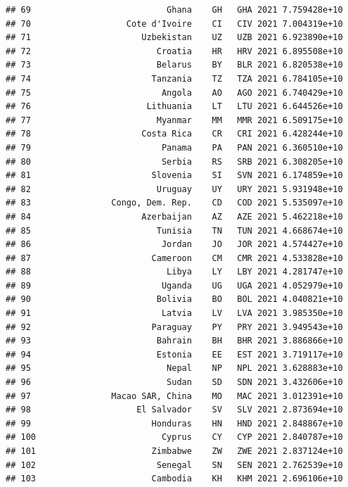 \documentclass[
]{article}
\begin{document}
\begin{verbatim}
## 69                           Ghana    GH   GHA 2021 7.759428e+10       
## 70                   Cote d'Ivoire    CI   CIV 2021 7.004319e+10       
## 71                      Uzbekistan    UZ   UZB 2021 6.923890e+10       
## 72                         Croatia    HR   HRV 2021 6.895508e+10       
## 73                         Belarus    BY   BLR 2021 6.820538e+10       
## 74                        Tanzania    TZ   TZA 2021 6.784105e+10       
## 75                          Angola    AO   AGO 2021 6.740429e+10       
## 76                       Lithuania    LT   LTU 2021 6.644526e+10       
## 77                         Myanmar    MM   MMR 2021 6.509175e+10       
## 78                      Costa Rica    CR   CRI 2021 6.428244e+10       
## 79                          Panama    PA   PAN 2021 6.360510e+10       
## 80                          Serbia    RS   SRB 2021 6.308205e+10       
## 81                        Slovenia    SI   SVN 2021 6.174859e+10       
## 82                         Uruguay    UY   URY 2021 5.931948e+10       
## 83                Congo, Dem. Rep.    CD   COD 2021 5.535097e+10       
## 84                      Azerbaijan    AZ   AZE 2021 5.462218e+10       
## 85                         Tunisia    TN   TUN 2021 4.668674e+10       
## 86                          Jordan    JO   JOR 2021 4.574427e+10       
## 87                        Cameroon    CM   CMR 2021 4.533828e+10       
## 88                           Libya    LY   LBY 2021 4.281747e+10       
## 89                          Uganda    UG   UGA 2021 4.052979e+10       
## 90                         Bolivia    BO   BOL 2021 4.040821e+10       
## 91                          Latvia    LV   LVA 2021 3.985350e+10       
## 92                        Paraguay    PY   PRY 2021 3.949543e+10       
## 93                         Bahrain    BH   BHR 2021 3.886866e+10       
## 94                         Estonia    EE   EST 2021 3.719117e+10       
## 95                           Nepal    NP   NPL 2021 3.628883e+10       
## 96                           Sudan    SD   SDN 2021 3.432606e+10       
## 97                Macao SAR, China    MO   MAC 2021 3.012391e+10       
## 98                     El Salvador    SV   SLV 2021 2.873694e+10       
## 99                        Honduras    HN   HND 2021 2.848867e+10       
## 100                         Cyprus    CY   CYP 2021 2.840787e+10       
## 101                       Zimbabwe    ZW   ZWE 2021 2.837124e+10       
## 102                        Senegal    SN   SEN 2021 2.762539e+10       
## 103                       Cambodia    KH   KHM 2021 2.696106e+10       

\end{verbatim}
\end{document}
